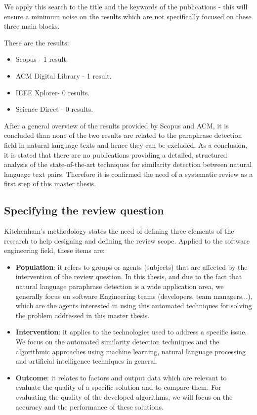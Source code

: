 We apply this search to the title and the keywords of the publications - this will ensure a minimum noise on the results which are not specifically focused on these three main blocks. 

These are the results:

\begin{itemize}
\item Scopus - 1 result.
\item ACM Digital Library - 1 result.
\item IEEE Xplorer- 0 results.
\item Science Direct - 0 results.
\end{itemize}

After a general overview of the results provided by Scopus and ACM, it is concluded than none of the two results are related to the paraphrase detection field in natural language texts and hence they can be excluded.
As a conclusion, it is stated that there are no publications providing a detailed, structured analysis of the state-of-the-art techniques for similarity detection between natural language text pairs. Therefore it is confirmed the need of a systematic review as a first step of this master thesis.

\subsection{Specifying the review question}

Kitchenham's methodology states the need of defining three elements of the research to help designing and defining the review scope. Applied to the software engineering field, these items are:

\begin{itemize}
\item \textbf{Population}: it refers to groups or agents (subjects) that are affected by the intervention of the review question. In this thesis, and due to the fact that natural language paraphrase detection is a wide application area, we generally focus on software Engineering teams (developers, team managers...), which are the agents interested in using this automated techniques for solving the problem addressed in this master thesis.
\item \textbf{Intervention}: it applies to the technologies used to address a specific issue. We focus on the automated similarity detection techniques and the algorithmic approaches using machine learning, natural language processing and artificial intelligence techniques in general.
\item \textbf{Outcome}: it relates to factors and output data which are relevant to evaluate the quality of a specific solution and to compare them. For evaluating the quality of the developed algorithms, we will focus on the accuracy and the performance of these solutions.
\end{itemize}

